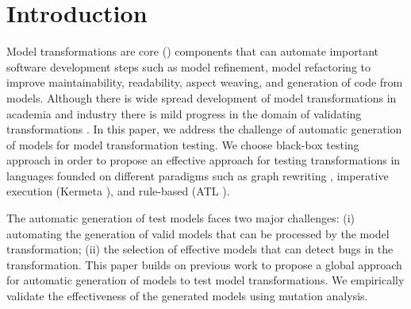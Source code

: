 \section{Introduction}
\label{section:Introduction}

Model transformations are core {\textMDE} ({\MDE}) components that can automate important software development steps such as model refinement, model refactoring to improve maintainability, readability, aspect weaving, and generation of code from models. Although there is wide spread development of model transformations in academia and industry there is mild progress in the domain of validating transformations \cite{Baudry09a}. In this paper, we address the challenge of automatic generation of models for model transformation testing. We choose black-box testing approach in order to propose an effective approach for testing transformations in languages founded on different paradigms such as graph rewriting \cite{bardohl99}, imperative execution (Kermeta \cite{muller2005}), and rule-based (ATL \cite{jouault2006}).

The automatic generation of test models faces two major challenges: (i) automating the generation of valid models that can be processed by the model transformation; (ii) the selection of effective  models that can detect bugs in the transformation. This paper builds on previous work \cite{sen2008} to propose a global approach for  automatic generation of models to test model transformations. We empirically validate the effectiveness of the generated models using mutation analysis.

